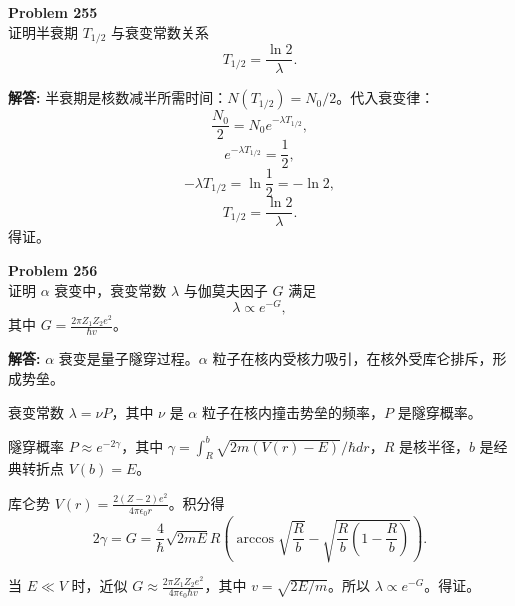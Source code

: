 \documentclass[12pt, a4paper, oneside]{ctexart}
\newenvironment{solution}{\par\noindent\textbf{解答:}\quad}{\par}
\begin{document}
\begin{mdframed}[backgroundcolor=gray!10, linewidth=0pt]
    \textbf{Problem 255} \\
    证明半衰期 $T_{1/2}$ 与衰变常数关系
    \[
    T_{1/2} = \frac{\ln 2}{\lambda}.
    \]
\end{mdframed}
\begin{solution}
    半衰期是核数减半所需时间：$N(T_{1/2}) = N_0 / 2$。代入衰变律：
    \[
    \frac{N_0}{2} = N_0 e^{-\lambda T_{1/2}},
    \]
    \[
    e^{-\lambda T_{1/2}} = \frac{1}{2},
    \]
    \[
    -\lambda T_{1/2} = \ln \frac{1}{2} = -\ln 2,
    \]
    \[
    T_{1/2} = \frac{\ln 2}{\lambda}.
    \]
    得证。
\end{solution}

\begin{mdframed}[backgroundcolor=gray!10, linewidth=0pt]
    \textbf{Problem 256} \\
    证明 $\alpha$ 衰变中，衰变常数 $\lambda$ 与伽莫夫因子 $G$ 满足
    \[
    \lambda \propto e^{-G},
    \]
    其中 $G = \frac{2\pi Z_1 Z_2 e^2}{\hbar v}$。
\end{mdframed}
\begin{solution}
    $\alpha$ 衰变是量子隧穿过程。$\alpha$ 粒子在核内受核力吸引，在核外受库仑排斥，形成势垒。
    
    衰变常数 $\lambda = \nu P$，其中 $\nu$ 是 $\alpha$ 粒子在核内撞击势垒的频率，$P$ 是隧穿概率。
    
    隧穿概率 $P \approx e^{-2 \gamma}$，其中 $\gamma = \int_{R}^{b} \sqrt{2m(V(r)-E)} / \hbar dr$，$R$ 是核半径，$b$ 是经典转折点 $V(b)=E$。
    
    库仑势 $V(r) = \frac{2(Z-2) e^2}{4\pi\epsilon_0 r}$。积分得
    \[
    2\gamma = G = \frac{4}{\hbar} \sqrt{2m E} R \left( \arccos \sqrt{\frac{R}{b}} - \sqrt{\frac{R}{b} (1 - \frac{R}{b})} \right).
    \]
    
    当 $E \ll V$ 时，近似 $G \approx \frac{2\pi Z_1 Z_2 e^2}{4\pi\epsilon_0 \hbar v}$，其中 $v = \sqrt{2E/m}$。所以 $\lambda \propto e^{-G}$。得证。
\end{solution}
\end{document}
